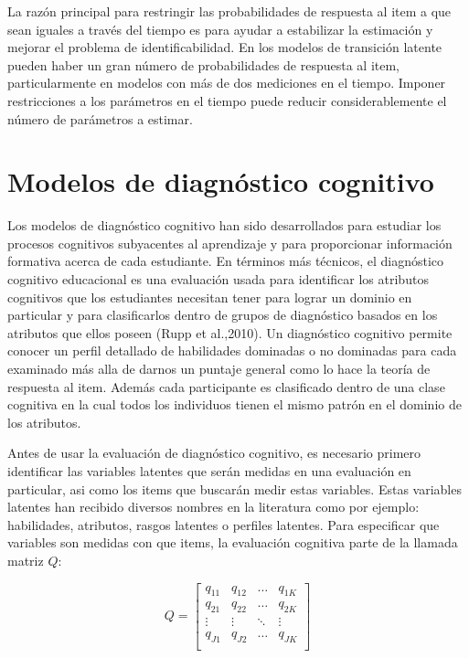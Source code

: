 			La raz\'{o}n principal para restringir las probabilidades de respuesta al item a que sean iguales a trav\'{e}s del tiempo es para ayudar a estabilizar la estimaci\'{o}n y mejorar el problema de identificabilidad. En los modelos de transici\'{o}n latente pueden haber un gran n\'{u}mero de probabilidades de respuesta al item, particularmente en modelos con m\'{a}s de dos mediciones en el tiempo. Imponer restricciones a los par\'{a}metros en el tiempo puede reducir considerablemente el n\'{u}mero de par\'{a}metros a estimar.
		
	\section{Modelos de diagn\'{o}stico cognitivo}
		Los modelos de diagn\'{o}stico cognitivo han sido desarrollados para estudiar los procesos cognitivos subyacentes al aprendizaje y para proporcionar informaci\'{o}n formativa acerca de cada estudiante. En t\'{e}rminos m\'{a}s t\'{e}cnicos, el diagn\'{o}stico cognitivo educacional es una evaluaci\'{o}n usada para identificar los atributos cognitivos que los estudiantes necesitan tener para lograr un dominio en particular y para clasificarlos dentro de grupos de diagn\'{o}stico basados en los atributos que ellos poseen (Rupp et al.,2010). Un diagn\'{o}stico cognitivo permite conocer un perfil detallado de habilidades dominadas o no dominadas para cada examinado m\'{a}s alla de darnos un puntaje general como lo hace la teor\'{i}a de respuesta al item. Adem\'{a}s cada participante es clasificado dentro de una clase cognitiva en la cual todos los individuos tienen el mismo patr\'{o}n en el dominio de los atributos.
		
		Antes de usar la evaluaci\'{o}n de diagn\'{o}stico cognitivo, es necesario primero identificar las variables latentes que ser\'{a}n medidas en una evaluaci\'{o}n en particular, asi como los items que buscar\'{a}n medir estas variables. Estas variables latentes han recibido diversos nombres en la literatura como por ejemplo: habilidades, atributos, rasgos latentes o perfiles latentes. Para especificar que variables son medidas con que items, la evaluaci\'{o}n cognitiva parte de la llamada matriz $Q$:
		
		\begin{equation} 
			Q = \left[ \begin{array}{cccc} 
				q_{11} & q_{12} & \ldots & q_{1K} \\  
				q_{21} & q_{22} & \ldots & q_{2K} \\    
				\vdots & \vdots & \ddots & \vdots \\
				q_{J1} & q_{J2} & \ldots & q_{JK} \\    
			\end{array} \right] \label{2.22}
		\end{equation}
		
